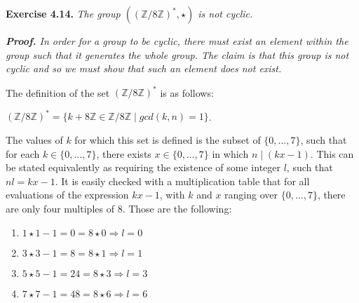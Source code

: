 \documentclass[12pt, a4paper]{article}
\begin{document}
\begin{flushleft}
\vspace{6mm}
\hspace{2mm}\textbf{Exercise 4.14.} \it{The group} $((\mathbb{Z}/8\mathbb{Z})^{*}, \star)$ \it{is not cyclic.}\hfil
\vspace{10mm}

\hspace{2mm}\it{\textbf{Proof.}} \rm In order for a group to be cyclic, there must exist an element within the group such that it generates the whole group. The claim is that this group is not cyclic and so we must show that such an element does not exist.\hfil
\vspace{16mm}

\begin{flushleft}
The definition of the set $(\mathbb{Z}/8\mathbb{Z})^{*}$ is as follows:\hfil
\end{flushleft}

\vspace{6mm}
\centerline{$(\mathbb{Z}/8\mathbb{Z})^{*}=\{k+8\mathbb{Z}\in\mathbb{Z}/8\mathbb{Z}\mid gcd(k, n)=1\}$.}\hfil

\vspace{2mm}
\begin{flushleft}
The values of $k$ for which this set is defined is the subset of $\{0, \ldots, 7\}$, such that for each $k\in\{0, \ldots, 7\}$, there exists $x\in\{0, \ldots, 7\}$ in which $n\mid(kx-1)$. This can be stated equivalently as requiring the existence of some integer $l$, such that $nl=kx-1$. It is easily checked with a multiplication table that for all evaluations of the expression $kx-1$, with $k$ and $x$ ranging over $\{0, \ldots, 7\}$, there are only four multiples of $8$. Those are the following:
\end{flushleft}

\vspace{6mm}

\begin{center}
\begin{enumerate}
\centering
\item \hspace{1.5mm}$1\star1-1=0=8\star0\Longrightarrow l=0$
\item \hspace{1.5mm}$3\star3-1=8=8\star1\Longrightarrow l=1$
\item $5\star5-1=24=8\star3\Longrightarrow l=3$
\item $7\star7-1=48=8\star6\Longrightarrow l=6$
\end{enumerate}
\end{center}


\end{flushleft}
\end{document}
